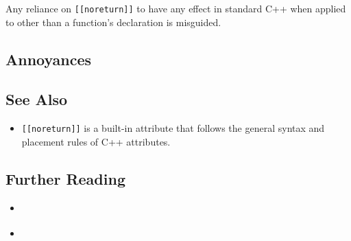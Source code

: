 \noindent Any reliance on \lstinline![[noreturn]]! to have any effect in standard C++
when applied to other than a function's declaration is misguided.

\subsection[Annoyances]{Annoyances}\label{annoyances}

\hspace*{\fill}


\subsection[See Also]{See Also}\label{see-also}

\begin{itemize}
\item{%
\lstinline![[noreturn]]! is a built-in attribute that follows the general syntax and placement rules of C++ attributes.}
\end{itemize}

\subsection[Further Reading]{Further Reading}\label{further-reading}

\begin{itemize}
\item{\cite{svoboda10}}
\item{\cite{sutter12}}
\end{itemize}




